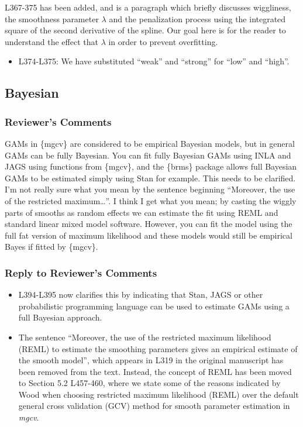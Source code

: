 \documentclass[
]{article}
\providecommand{\tightlist}{%
  \setlength{\itemsep}{0pt}\setlength{\parskip}{0pt}}
\begin{document}
L367-375 has been added, and is a paragraph which briefly discusses wiggliness, the smoothness parameter \(\lambda\) and the penalization process using the integrated square of the second derivative of the spline. Our goal here is for the reader to understand the effect that \(\lambda\) in order to prevent overfitting.

\begin{itemize}
\tightlist
\item
  L374-L375: We have substituted ``weak'' and ``strong'' for ``low'' and ``high''.
\end{itemize}

\hypertarget{bayesian}{%
\subsection{Bayesian}\label{bayesian}}

\hypertarget{reviewers-comments-6}{%
\subsubsection{Reviewer's Comments}\label{reviewers-comments-6}}

GAMs in \{mgcv\} are considered to be empirical Bayesian models, but in general GAMs can be fully Bayesian. You can fit fully Bayesian GAMs using INLA and JAGS using functions from \{mgcv\}, and the \{brms\} package allows full Bayesian GAMs to be estimated simply using Stan for example. This needs to be clarified.
I'm not really sure what you mean by the sentence beginning ``Moreover, the use of the restricted maximum\ldots{}''. I think I get what you mean; by casting the wiggly parts of smooths as random effects we can estimate the fit using REML
and standard linear mixed model software. However, you can fit the model using the full fat version of maximum likelihood and these models would still be empirical Bayes if fitted by \{mgcv\}.

\hypertarget{section-7}{%
\subsubsection{\texorpdfstring{\textcolor{reviewersblue} {Reply to Reviewer's Comments}}{}}\label{section-7}}

\begin{itemize}
\item
  L394-L395 now clarifies this by indicating that Stan, JAGS or other probabilistic programming language can be used to estimate GAMs using a full Bayesian approach.
\item
  The sentence ``Moreover, the use of the restricted maximum likelihood (REML) to estimate the smoothing parameters gives an empirical estimate of the smooth model'', which appears in L319 in the original manuscript has been removed from the text. Instead, the concept of REML has been moved to Section 5.2 L457-460, where we state some of the reasons indicated by Wood when choosing restricted maximum likelihood (REML) over the default general cross validation (GCV) method for smooth parameter estimation in \emph{mgcv}.
\end{itemize}
\end{document}
